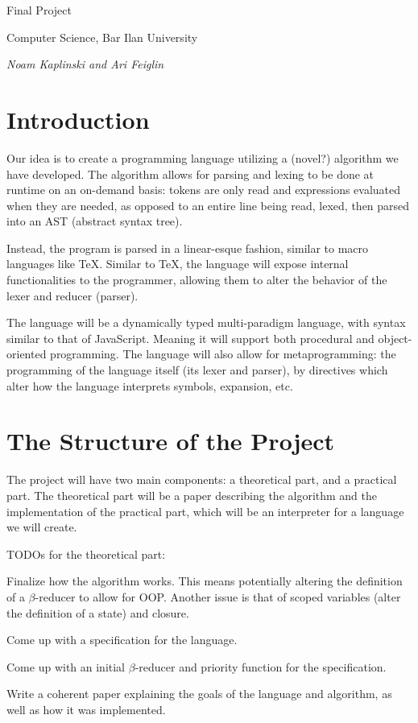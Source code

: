 


\centerline{Final Project}
\centerline{Computer Science, Bar Ilan University}
\smallskip
\centerline{\it Noam Kaplinski and Ari Feiglin}

\section{Introduction}

Our idea is to create a programming language utilizing a (novel?) algorithm we have developed.
The algorithm allows for parsing and lexing to be done at runtime on an on-demand basis: tokens are only read and expressions evaluated when they are needed, as opposed to an
entire line being read, lexed, then parsed into an AST (abstract syntax tree).

Instead, the program is parsed in a linear-esque fashion, similar to macro languages like \TeX.
Similar to \TeX, the language will expose internal functionalities to the programmer, allowing them to alter the behavior of the lexer and reducer (parser).

The language will be a dynamically typed multi-paradigm language, with syntax similar to that of JavaScript.
Meaning it will support both procedural and object-oriented programming.
The language will also allow for metaprogramming: the programming of the language itself (its lexer and parser), by directives which alter how the language interprets symbols,
expansion, etc.

\section{The Structure of the Project}

The project will have two main components: a theoretical part, and a practical part.
The theoretical part will be a paper describing the algorithm and the implementation of the practical part, which will be an interpreter for a language we will create.

TODOs for the theoretical part:
\benum
    \item Finalize how the algorithm works.
    This means potentially altering the definition of a $\beta$-reducer to allow for OOP.
    Another issue is that of scoped variables (alter the definition of a state) and closure.
    \item Come up with a specification for the language.
    \item Come up with an initial $\beta$-reducer and priority function for the specification.
    \item Write a coherent paper explaining the goals of the language and algorithm, as well as how it was implemented.
\eenum

